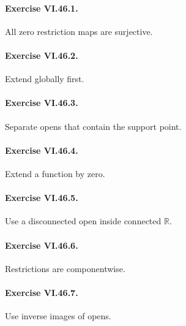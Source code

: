 \paragraph{Exercise VI.46.1.}
\begin{hint}
All zero restriction maps are surjective.
\end{hint}

\paragraph{Exercise VI.46.2.}
\begin{hint}
Extend globally first.
\end{hint}

\paragraph{Exercise VI.46.3.}
\begin{hint}
Separate opens that contain the support point.
\end{hint}

\paragraph{Exercise VI.46.4.}
\begin{hint}
Extend a function by zero.
\end{hint}

\paragraph{Exercise VI.46.5.}
\begin{hint}
Use a disconnected open inside connected \(\mathbb R\).
\end{hint}

\paragraph{Exercise VI.46.6.}
\begin{hint}
Restrictions are componentwise.
\end{hint}

\paragraph{Exercise VI.46.7.}
\begin{hint}
Use inverse images of opens.
\end{hint}

